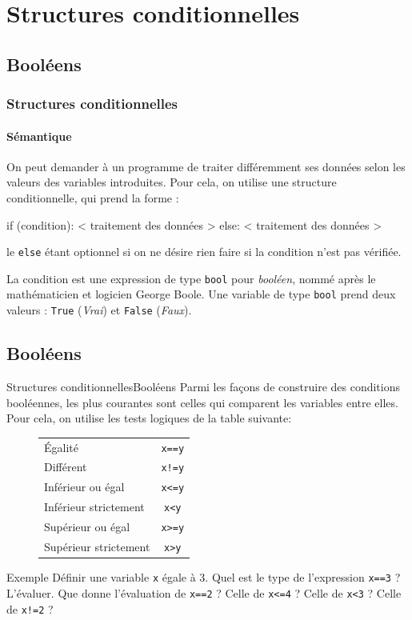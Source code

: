 \documentclass[10pt]{beamer}
\begin{document}
\section{Structures conditionnelles}

\subsection{Booléens}

\begin{frame}[fragile]
	\frametitle{Structures conditionnelles}
	\framesubtitle{Sémantique}
	On peut demander à un programme de traiter différemment ses données selon les valeurs des variables introduites. Pour cela, on utilise une structure conditionnelle, qui prend la forme :
	\begin{semiverbatim}if (condition):
        < traitement des données >
    else:
        < traitement des données >\end{semiverbatim}
    le \verb|else| étant optionnel si on ne désire rien faire si la condition n'est pas vérifiée.
    \pause
    
    La condition est une expression de type \verb|bool| pour \textit{booléen}, nommé après le mathématicien et logicien George Boole. Une variable de type \verb|bool| prend deux valeurs : \verb|True| (\textit{Vrai}) et \verb|False| (\textit{Faux}).
\end{frame}

\subsection{Booléens}

\begin{frame}[fragile]{Structures conditionnelles}{Booléens}
	Parmi les façons de construire des conditions booléennes, les plus courantes sont celles qui comparent les variables entre elles. Pour cela, on utilise les tests logiques de la table suivante:\pause
	\begin{figure}
	\centering
	\begin{tabular}{|l|c|}\hline
	Égalité & \verb|x==y| \\ 
	Différent & \verb|x!=y| \\ 
	Inférieur ou égal & \verb|x<=y| \\ 
	Inférieur strictement & \verb|x<y| \\ 
	Supérieur ou égal & \verb|x>=y| \\
	Supérieur strictement & \verb|x>y| \\ \hline
	\end{tabular}
	\end{figure}
	\pause
	
	\begin{block}{Exemple}
	Définir une variable \verb|x| égale à $3$. Quel est le type de l'expression \verb|x==3| ? L'évaluer. Que donne l'évaluation de \verb|x==2| ? Celle de \verb|x<=4| ? Celle de \verb|x<3| ? Celle de \verb|x!=2| ?
	\end{block}
\end{frame}
\end{document}
